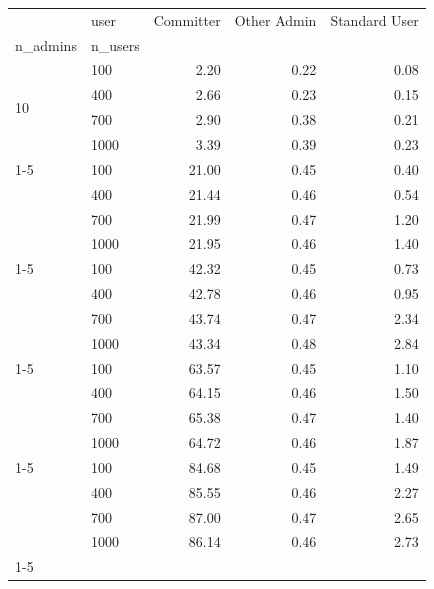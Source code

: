 \begin{tabular}{llrrr}
\toprule
 & user & Committer & Other Admin & Standard User \\
n_admins & n_users &  &  &  \\
\midrule
\multirow[t]{4}{*}{10} & 100 & 2.20 & 0.22 & 0.08 \\
                        & 400 & 2.66 & 0.23 & 0.15 \\
                        & 700 & 2.90 & 0.38 & 0.21 \\
                        & 1000 & 3.39 & 0.39 & 0.23 \\
\cline{1-5}
\multirow[t]{4}{*}{50} & 100 & 21.00 & 0.45 & 0.40 \\
                        & 400 & 21.44 & 0.46 & 0.54 \\
                        & 700 & 21.99 & 0.47 & 1.20 \\
                        & 1000 & 21.95 & 0.46 & 1.40 \\
\cline{1-5}
\multirow[t]{4}{*}{100} & 100 & 42.32 & 0.45 & 0.73 \\
                        & 400 & 42.78 & 0.46 & 0.95 \\
                        & 700 & 43.74 & 0.47 & 2.34 \\
                        & 1000 & 43.34 & 0.48 & 2.84 \\
\cline{1-5}
\multirow[t]{4}{*}{150} & 100 & 63.57 & 0.45 & 1.10 \\
                        & 400 & 64.15 & 0.46 & 1.50 \\
                        & 700 & 65.38 & 0.47 & 1.40 \\
                        & 1000 & 64.72 & 0.46 & 1.87 \\
\cline{1-5}
\multirow[t]{4}{*}{200} & 100 & 84.68 & 0.45 & 1.49 \\
                        & 400 & 85.55 & 0.46 & 2.27 \\
                        & 700 & 87.00 & 0.47 & 2.65 \\
                        & 1000 & 86.14 & 0.46 & 2.73 \\
\cline{1-5}
\bottomrule
\end{tabular}
